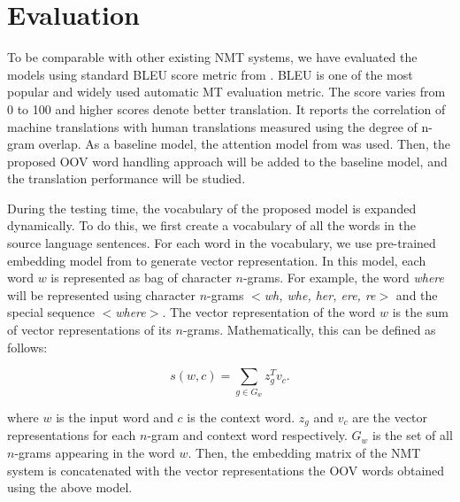 
\section{Evaluation}
\label{sec:mt_eval}
To be comparable with other existing NMT systems, we have evaluated the models using standard BLEU score metric from  \cite{papineni2002bleu}. BLEU is one of the most popular and widely used automatic MT evaluation metric. The score varies from 0 to 100 and higher scores denote better translation. It reports the correlation of machine translations with human translations measured using the degree of n-gram overlap. As a baseline model, the attention model from \cite{luong2015effective} was used. Then, the proposed OOV word handling approach will be added to the baseline model, and the translation performance will be studied. 

During the testing time, the vocabulary of the proposed model is expanded dynamically. To do this, we first create a vocabulary of all the words in the source language sentences. For each word in the vocabulary, we use pre-trained embedding model from \cite{bojanowski2016enriching} to generate vector representation. In this model, each word $w$ is represented as bag of character $n$-grams. For example, the word \textit{where} will be represented using character $n$-grams \textit{ $<$wh, whe, her, ere, re$>$ } and the special sequence \textit{$<$where$>$}. The vector representation of the word $w$ is the sum of vector representations of its $n$-grams. Mathematically, this can be defined as follows:

\begin{equation}
s(w,c) = \sum_{g \in G_w} z_g^{T} v_c.
\end{equation}

where $w$ is the input word and $c$ is the context word. $z_g$ and $v_c$ are the vector representations for each $n$-gram and context word respectively. $G_w$ is the set of all $n$-grams appearing in the word $w$. Then, the embedding matrix of the NMT system is concatenated with the vector representations the OOV words obtained using the above model.

